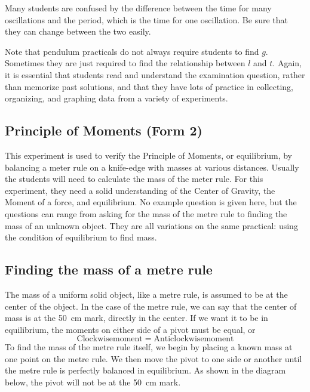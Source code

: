 Many students are confused by the difference between the time for many oscillations and
the period, which is the time for one oscillation. Be sure that they can change between
the two easily.

Note that pendulum practicals do not always require students to find $g$. Sometimes they are just required to find the relationship between $l$ and $t$. Again, it is essential that students read and understand the examination question, rather than memorize past solutions, and that they have lots of practice in collecting, organizing, and graphing data from a variety of experiments.

\subsection{Principle of Moments (Form 2)}

This experiment is used to verify the Principle of Moments, or equilibrium, by
balancing a meter rule on a knife-edge with masses at various distances. Usually the
students will need to calculate the mass of the meter rule. For this experiment, they need
a solid understanding of the Center of Gravity, the Moment of a force, and equilibrium.
No example question is given here, but the questions can range from asking for
the mass of the metre rule to finding the mass of an unknown object. They are all
variations on the same practical: using the condition of equilibrium to find mass.

\subsection{Finding the mass of a metre rule}

The mass of a uniform solid object, like a metre rule, is assumed to be at the
center of the object. In the case of the metre rule, we can say that the center of mass is at
the 50~cm mark, directly in the center. If we want it to be in equilibrium, the moments on
either side of a pivot must be equal, or $$ \mathrm{Clockwise moment} = \mathrm{Anticlockwise moment}$$
To find the mass of the metre rule itself, we begin by placing a known mass at one
point on the metre rule. We then move the pivot to one side or another until the metre
rule is perfectly balanced in equilibrium. As shown in the diagram below, the pivot will
not be at the 50~cm mark.


